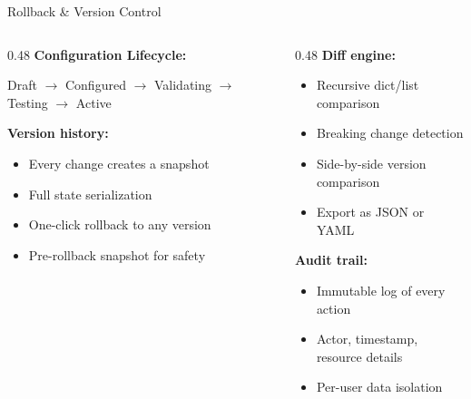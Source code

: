 \documentclass[aspectratio=169,11pt]{beamer}
\begin{document}
\begin{frame}{Rollback \& Version Control}
\begin{columns}[T]
\begin{column}{0.48\textwidth}
\textbf{Configuration Lifecycle:}
\begin{center}
{\small Draft $\to$ Configured $\to$ Validating $\to$ Testing $\to$ Active}
\end{center}

\vspace{0.3em}
\textbf{Version history:}
\begin{itemize}
\item Every change creates a snapshot
\item Full state serialization
\item One-click rollback to any version
\item Pre-rollback snapshot for safety
\end{itemize}
\end{column}
\begin{column}{0.48\textwidth}
\textbf{Diff engine:}
\begin{itemize}
\item Recursive dict/list comparison
\item Breaking change detection
\item Side-by-side version comparison
\item Export as JSON or YAML
\end{itemize}

\vspace{0.3em}
\textbf{Audit trail:}
\begin{itemize}
\item Immutable log of every action
\item Actor, timestamp, resource details
\item Per-user data isolation
\end{itemize}
\end{column}
\end{columns}
\end{frame}
\end{document}
